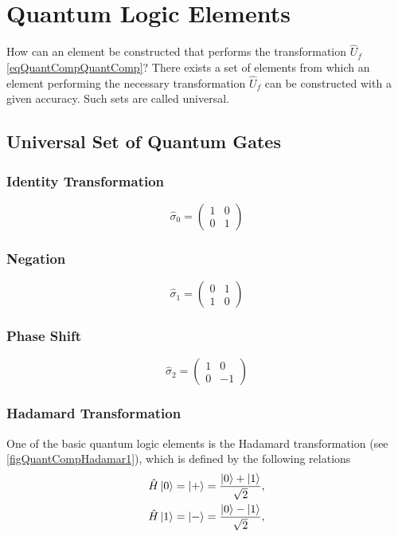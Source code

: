 \section{Quantum Logic Elements}
How can an element be constructed that performs the transformation $\hat{U}_f$ \eqref{eqQuantCompQuantComp}? There exists a set of elements from which an element performing the necessary transformation $\hat{U}_f$ can be constructed with a given accuracy. Such sets are called universal.

\subsection{Universal Set of Quantum Gates}

\subsubsection{Identity Transformation}

\[
\hat{\sigma}_0 = \begin{pmatrix}
1 & 0 \\
0 & 1
\end{pmatrix}
\]

\subsubsection{Negation}

\[
\hat{\sigma}_1 = \begin{pmatrix}
0 & 1 \\
1 & 0
\end{pmatrix}
\]

\subsubsection{Phase Shift}

\[
\hat{\sigma}_2 = \begin{pmatrix}
1 & 0 \\
0 & -1
\end{pmatrix}
\]

\subsubsection{Hadamard Transformation}
One of the basic quantum logic elements is the Hadamard transformation (see \autoref{figQuantCompHadamar1}), which is defined by the following relations
\begin{eqnarray}
\hat{H} \ket{0} = \ket{+} =  
\frac{\ket{0} + \ket{1} }{\sqrt{2}},
\nonumber \\
\hat{H} \ket{1} = \ket{-} = 
\frac{\ket{0} - \ket{1} }{\sqrt{2}},
\nonumber
\end{eqnarray}

